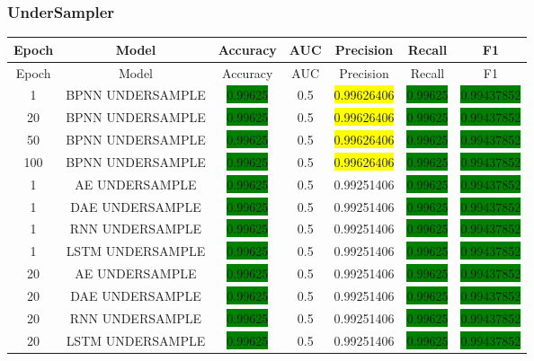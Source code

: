 \subsubsection{UnderSampler}
\begin{longtable}{|c|c|c|c|c|c|c|}
	\hline
	Epoch & Model & Accuracy & AUC & Precision & Recall & F1\\ \hline
	\endfirsthead
	\hline
	Epoch & Model & Accuracy & AUC & Precision & Recall & F1\\ \hline
	\endhead
	1 & BPNN UNDERSAMPLE & \colorbox{green}{0.99625} & 0.5 & \colorbox{yellow}{0.99626406} & \colorbox{green}{0.99625} & \colorbox{green}{0.99437852}\\ \hline
	20 & BPNN UNDERSAMPLE & \colorbox{green}{0.99625} & 0.5 & \colorbox{yellow}{0.99626406} & \colorbox{green}{0.99625} & \colorbox{green}{0.99437852}\\ \hline
	50 & BPNN UNDERSAMPLE & \colorbox{green}{0.99625} & 0.5 & \colorbox{yellow}{0.99626406} & \colorbox{green}{0.99625} & \colorbox{green}{0.99437852}\\ \hline
	100 & BPNN UNDERSAMPLE & \colorbox{green}{0.99625} & 0.5 & \colorbox{yellow}{0.99626406} & \colorbox{green}{0.99625} & \colorbox{green}{0.99437852}\\ \hline
	1 & AE UNDERSAMPLE & \colorbox{green}{0.99625} & 0.5 & 0.99251406 & \colorbox{green}{0.99625} & \colorbox{green}{0.99437852}\\ \hline
	1 & DAE UNDERSAMPLE & \colorbox{green}{0.99625} & 0.5 & 0.99251406 & \colorbox{green}{0.99625} & \colorbox{green}{0.99437852}\\ \hline
	1 & RNN UNDERSAMPLE & \colorbox{green}{0.99625} & 0.5 & 0.99251406 & \colorbox{green}{0.99625} & \colorbox{green}{0.99437852}\\ \hline
	1 & LSTM UNDERSAMPLE & \colorbox{green}{0.99625} & 0.5 & 0.99251406 & \colorbox{green}{0.99625} & \colorbox{green}{0.99437852}\\ \hline
	20 & AE UNDERSAMPLE & \colorbox{green}{0.99625} & 0.5 & 0.99251406 & \colorbox{green}{0.99625} & \colorbox{green}{0.99437852}\\ \hline
	20 & DAE UNDERSAMPLE & \colorbox{green}{0.99625} & 0.5 & 0.99251406 & \colorbox{green}{0.99625} & \colorbox{green}{0.99437852}\\ \hline
	20 & RNN UNDERSAMPLE & \colorbox{green}{0.99625} & 0.5 & 0.99251406 & \colorbox{green}{0.99625} & \colorbox{green}{0.99437852}\\ \hline
	20 & LSTM UNDERSAMPLE & \colorbox{green}{0.99625} & 0.5 & 0.99251406 & \colorbox{green}{0.99625} & \colorbox{green}{0.99437852}\\ \hline

\end{longtable}
